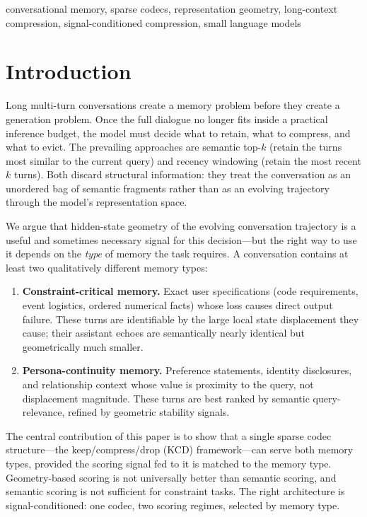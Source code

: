 \documentclass[conference]{IEEEtran}
\begin{document}
\begin{IEEEkeywords}
conversational memory, sparse codecs, representation geometry, long-context
compression, signal-conditioned compression, small language models
\end{IEEEkeywords}

\section{Introduction}
\label{sec:intro}

Long multi-turn conversations create a memory problem before they create a
generation problem. Once the full dialogue no longer fits inside a practical
inference budget, the model must decide what to retain, what to compress, and
what to evict. The prevailing approaches are semantic top-$k$ (retain the turns
most similar to the current query) and recency windowing (retain the most recent
$k$ turns). Both discard structural information: they treat the conversation
as an unordered bag of semantic fragments rather than as an evolving trajectory
through the model's representation space.

We argue that hidden-state geometry of the evolving conversation trajectory is
a useful and sometimes necessary signal for this decision---but the right way to
use it depends on the \emph{type} of memory the task requires. A conversation
contains at least two qualitatively different memory types:

\begin{enumerate}[leftmargin=1.4em]
\item \textbf{Constraint-critical memory.} Exact user specifications (code
  requirements, event logistics, ordered numerical facts) whose loss causes
  direct output failure. These turns are identifiable by the large local
  state displacement they cause; their assistant echoes are semantically
  nearly identical but geometrically much smaller.
\item \textbf{Persona-continuity memory.} Preference statements, identity
  disclosures, and relationship context whose value is proximity to the query,
  not displacement magnitude. These turns are best ranked by semantic
  query-relevance, refined by geometric stability signals.
\end{enumerate}

The central contribution of this paper is to show that a single sparse codec
structure---the keep/compress/drop (KCD) framework---can serve both memory
types, provided the scoring signal fed to it is matched to the memory type.
Geometry-based scoring is not universally better than semantic scoring, and
semantic scoring is not sufficient for constraint tasks. The right architecture
is signal-conditioned: one codec, two scoring regimes, selected by memory type.
\end{document}
